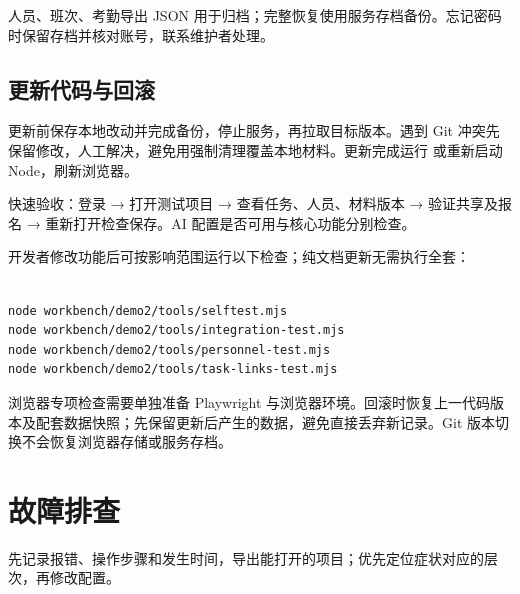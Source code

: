 \documentclass[UTF8,fontset=windows,zihao=-4,a4paper]{ctexart}
\begin{document}
人员、班次、考勤导出 JSON 用于归档；完整恢复使用服务存档备份。忘记密码时保留存档并核对账号，联系维护者处理。


\subsection*{更新代码与回滚}

更新前保存本地改动并完成备份，停止服务，再拉取目标版本。遇到 Git 冲突先保留修改，人工解决，避免用强制清理覆盖本地材料。更新完成运行  或重新启动 Node，刷新浏览器。


快速验收：登录 → 打开测试项目 → 查看任务、人员、材料版本 → 验证共享及报名 → 重新打开检查保存。AI 配置是否可用与核心功能分别检查。


开发者修改功能后可按影响范围运行以下检查；纯文档更新无需执行全套：



\begin{Verbatim}[fontsize=\small,breaklines=true,breakanywhere=true,frame=single,rulecolor=\color{Rule},framesep=7pt]

node workbench/demo2/tools/selftest.mjs
node workbench/demo2/tools/integration-test.mjs
node workbench/demo2/tools/personnel-test.mjs
node workbench/demo2/tools/task-links-test.mjs

\end{Verbatim}

浏览器专项检查需要单独准备 Playwright 与浏览器环境。回滚时恢复上一代码版本及配套数据快照；先保留更新后产生的数据，避免直接丢弃新记录。Git 版本切换不会恢复浏览器存储或服务存档。


\section{故障排查}\label{sec:6}

先记录报错、操作步骤和发生时间，导出能打开的项目；优先定位症状对应的层次，再修改配置。
\end{document}
